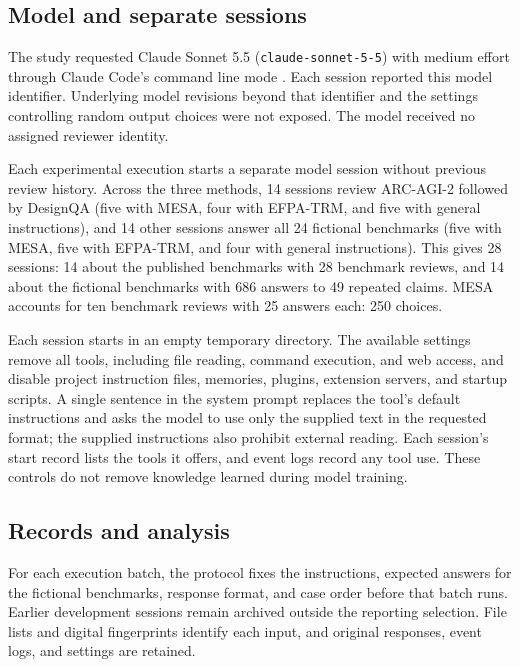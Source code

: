 \documentclass[10pt,conference]{IEEEtran}
\begin{document}
\subsection{Model and separate sessions}
The study requested Claude Sonnet 5.5 (\texttt{claude-sonnet-5-5}) with medium effort through Claude Code's command line mode \cite{anthropic_claude_code_cli}. Each session reported this model identifier. Underlying model revisions beyond that identifier and the settings controlling random output choices were not exposed. The model received no assigned reviewer identity.

Each experimental execution starts a separate model session without previous review history. Across the three methods, 14 sessions review ARC-AGI-2 followed by DesignQA (five with MESA, four with EFPA-TRM, and five with general instructions), and 14 other sessions answer all 24 fictional benchmarks (five with MESA, five with EFPA-TRM, and four with general instructions). This gives 28 sessions: 14 about the published benchmarks with 28 benchmark reviews, and 14 about the fictional benchmarks with 686 answers to 49 repeated claims. MESA accounts for ten benchmark reviews with 25 answers each: 250 choices.

Each session starts in an empty temporary directory. The available settings remove all tools, including file reading, command execution, and web access, and disable project instruction files, memories, plugins, extension servers, and startup scripts. A single sentence in the system prompt replaces the tool's default instructions and asks the model to use only the supplied text in the requested format; the supplied instructions also prohibit external reading. Each session's start record lists the tools it offers, and event logs record any tool use. These controls do not remove knowledge learned during model training.

\subsection{Records and analysis}
For each execution batch, the protocol fixes the instructions, expected answers for the fictional benchmarks, response format, and case order before that batch runs. Earlier development sessions remain archived outside the reporting selection. File lists and digital fingerprints identify each input, and original responses, event logs, and settings are retained.
\end{document}
